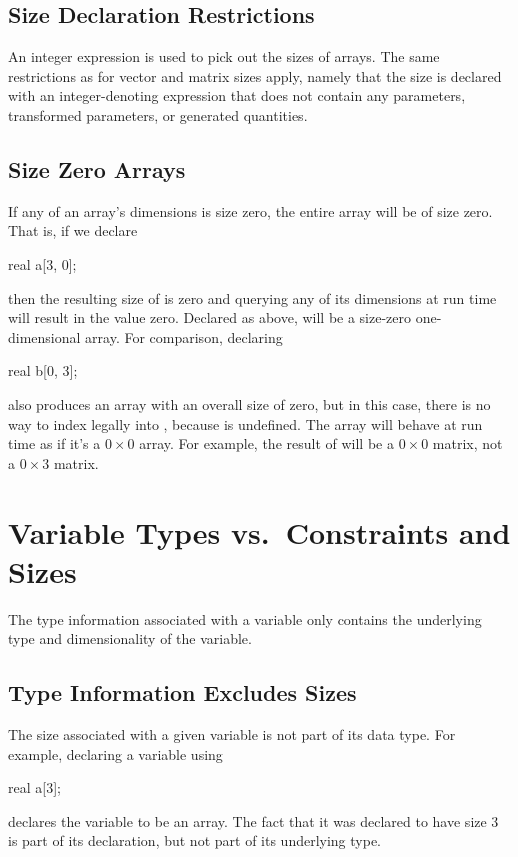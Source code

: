 \subsection{Size Declaration Restrictions}

An integer expression is used to pick out the sizes of arrays.  The
same restrictions as for vector and matrix sizes apply, namely that
the size is declared with an integer-denoting expression that does not
contain any parameters, transformed parameters, or generated quantities.

\subsection{Size Zero Arrays}

If any of an array's dimensions is size zero, the entire array will be
of size zero.  That is, if we declare
%
\begin{stancode}
real a[3, 0];
\end{stancode}
%
then the resulting size of  is zero and querying any of its
dimensions at run time will result in the value zero.  Declared as
above,  will be a size-zero one-dimensional array.  For
comparison, declaring
%
\begin{stancode}
real b[0, 3];
\end{stancode}
%
also produces an array with an overall size of zero, but in this case,
there is no way to index legally into , because  is
undefined.  The array will behave at run time as if it's a $0 \times
0$ array.  For example, the result of  will be a
$0 \times 0$ matrix, not a $0 \times 3$ matrix.


\section{Variable Types vs.\ Constraints and Sizes}

The type information associated with a variable only contains the
underlying type and dimensionality of the variable.

\subsection{Type Information Excludes Sizes}

The size associated with a given variable is not part of its data
type.  For example, declaring a variable using
\begin{stancode}
real a[3];
\end{stancode}
%
declares the variable  to be an array.  The fact that it was
declared to have size 3 is part of its declaration, but not part of
its underlying type.

